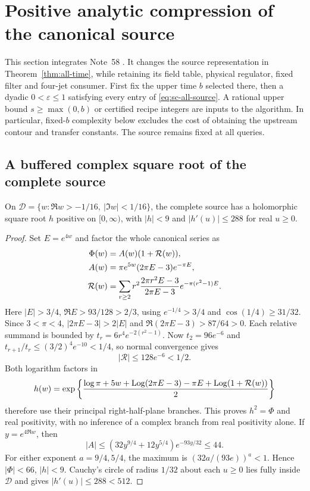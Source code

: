 \section{Positive analytic compression of the canonical source}
\label{sec:analytic-source}
This section integrates Note~58 \cite{n58}. It changes the source
representation in Theorem~\ref{thm:all-time}, while retaining its
field table, physical regulator, fixed filter and four-jet consumer.
First fix the upper time $b$ selected there, then a dyadic
$0<\varepsilon\le1$ satisfying every entry of
\eqref{eq:sc-all-source}. A rational upper bound $s\ge\max(0,b)$
or certified recipe integers are inputs to the algorithm. In particular,
fixed-$b$ complexity below excludes the cost of obtaining the upstream
contour and transfer constants. The source remains fixed at all queries.

\subsection{A buffered complex square root of the complete source}
\begin{proposition}\label{prop:ac-root}
On $\mathcal D=\{w:\Re w>-1/16,\ |\Im w|<1/16\}$, the
complete source has a holomorphic square root $h$ positive on $[0,\infty)$,
with $|h|<9$ and $|h'(u)|\le288$ for real $u\ge0$.
\end{proposition}
\begin{proof}
Set $E=e^{4w}$ and factor the whole canonical series as
\begin{align}
 \Phi(w)&=A(w)(1+\mathcal R(w)),\notag\\
 A(w)&=\pi e^{5w}(2\pi E-3)e^{-\pi E},\notag\\
 \mathcal R(w)&=\sum_{r\ge2}
 r^2\frac{2\pi r^2E-3}{2\pi E-3}e^{-\pi(r^2-1)E}.
 \label{eq:ac-factor}
\end{align}
Here $|E|>3/4$, $\Re E>93/128>2/3$, using
$e^{-1/4}>3/4$ and $\cos(1/4)\ge31/32$. Since $3<\pi<4$,
$|2\pi E-3|>2|E|$ and $\Re(2\pi E-3)>87/64>0$.
Each relative summand is bounded by
$t_r=6r^4e^{-2(r^2-1)}$. Now $t_2=96e^{-6}$ and
$t_{r+1}/t_r\le(3/2)^4e^{-10}<1/4$, so normal convergence gives
\begin{equation}
 |\mathcal R|\le128e^{-6}<1/2.
 \label{eq:ac-relative-tail}
\end{equation}
Both logarithm factors in
\begin{equation}
 h(w)=\exp\left\{\frac{\log\pi+5w+\operatorname{Log}(2\pi E-3)
                     -\pi E+\operatorname{Log}(1+\mathcal R(w))}{2}\right\}
 \label{eq:ac-root}
\end{equation}
therefore use their principal right-half-plane branches. This proves
$h^2=\Phi$ and real positivity, with no inference of a complex branch
from real positivity alone. If $y=e^{4\Re w}$, then
\[
 |A|\le(32y^{9/4}+12y^{5/4})e^{-93y/32}\le44.
\]
For either exponent $a=9/4,5/4$, the maximum is
$(32a/(93e))^a<1$. Hence $|\Phi|<66$, $|h|<9$.
Cauchy's circle of radius $1/32$ about each $u\ge0$ lies fully
inside $\mathcal D$ and gives $|h'(u)|\le288<512$.
\end{proof}

